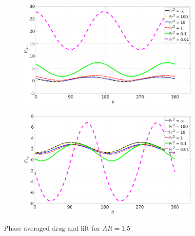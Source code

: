\begin{figure}
    \centering
    \begin{subfigure}[b]{0.49\textwidth}
        \centering
        \includegraphics[width=\textwidth]{images/spinning_ellipse/padrag1p5.eps}
        \caption{}
        \label{fig:padrag1p5}
    \end{subfigure}
    \hfill
    \begin{subfigure}[b]{0.49\textwidth}
        \centering
        \includegraphics[width=\textwidth]{images/spinning_ellipse/palift1p5.eps}
        \caption{}
        \label{fig:palift1p5}
    \end{subfigure}
    \caption{Phase averaged drag and lift for $AR = 1.5$}
    \label{fig:pa1p5}
\end{figure}
